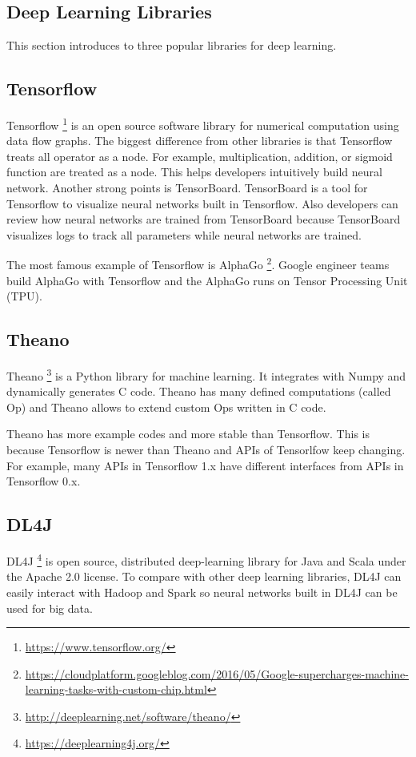 \documentclass[draft,dvipsnames]{drexel-thesis}
\begin{document}
\begin{thesis}
\section{Deep Learning Libraries}\label{sec:DLL}
This section introduces to three popular libraries for deep learning.

\subsection{Tensorflow}
Tensorflow \footnote{\url{https://www.tensorflow.org/}} is an open source software library for numerical computation using data flow graphs. The biggest difference from other libraries is that Tensorflow treats all operator as a node. For example, multiplication, addition, or sigmoid function are treated as a node.  This helps developers intuitively build neural network. Another strong points is TensorBoard. TensorBoard is a tool for Tensorflow to visualize neural networks built in Tensorflow. Also developers can review how neural networks are trained from TensorBoard because TensorBoard visualizes logs to track all parameters while neural networks are trained.

The most famous example of Tensorflow is AlphaGo \footnote{\url{https://cloudplatform.googleblog.com/2016/05/Google-supercharges-machine-learning-tasks-with-custom-chip.html}}. Google engineer teams build AlphaGo with Tensorflow and the AlphaGo runs on Tensor Processing Unit (TPU).


\subsection{Theano}
Theano \footnote{\url{http://deeplearning.net/software/theano/}} is a Python library for machine learning. It integrates with Numpy and dynamically generates C code. Theano has many defined computations (called Op) and Theano allows to extend custom Ops written in C code.

Theano has more example codes and more stable than Tensorflow. This is because Tensorflow is newer than Theano and APIs of Tensorlfow keep changing. For example, many APIs in Tensorflow 1.x have different interfaces from APIs in Tensorflow 0.x.


\subsection{DL4J}
DL4J \footnote{\url{https://deeplearning4j.org/}} is open source, distributed deep-learning library for Java and Scala under the Apache 2.0 license. To compare with other deep learning libraries, DL4J can easily interact with Hadoop and Spark so neural networks built in DL4J can be used for big data.



\end{thesis}
\end{document}
